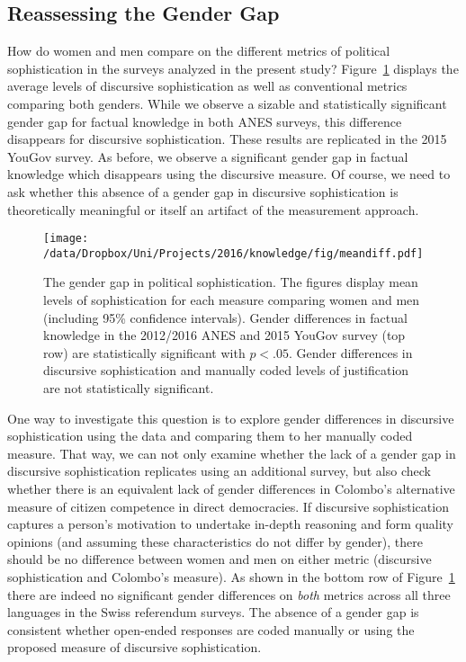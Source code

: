 \subsection*{Reassessing the Gender Gap}
How do women and men compare on the different metrics of political sophistication in the surveys analyzed in the present study? Figure~\ref{fig:meandiff} displays the average levels of discursive sophistication as well as conventional metrics comparing both genders. While we observe a sizable and statistically significant gender gap for factual knowledge in both ANES surveys, this difference disappears for discursive sophistication. These results are replicated in the 2015 YouGov survey. As before, we observe a significant gender gap in factual knowledge which disappears using the discursive measure. Of course, we need to ask whether this absence of a gender gap in discursive sophistication is theoretically meaningful or itself an artifact of the measurement approach. 

\begin{figure}[h]\centering
	\texttt{[image: /data/Dropbox/Uni/Projects/2016/knowledge/fig/meandiff.pdf]}
	\caption[The gender gap in political sophistication]{The gender gap in political sophistication. The figures display mean levels of sophistication for each measure comparing women and men (including 95\% confidence intervals). Gender differences in factual knowledge in the 2012/2016 ANES and 2015 YouGov survey (top row) are statistically significant with $p<.05$. Gender differences in discursive sophistication and manually coded levels of justification \citep{colombo2016justifications} are not statistically significant.}\label{fig:meandiff}
\end{figure}

One way to investigate this question is to explore gender differences in discursive sophistication using the \citet{colombo2016justifications} data and comparing them to her manually coded measure. That way, we can not only examine whether the lack of a gender gap in discursive sophistication replicates using an additional survey, but also check whether there is an equivalent lack of gender differences in Colombo's alternative measure of citizen competence in direct democracies. If discursive sophistication captures a person's motivation to undertake in-depth reasoning and form quality opinions (and assuming these characteristics do not differ by gender), there should be no difference between women and men on either metric (discursive sophistication and Colombo's measure).  As shown in the bottom row of Figure~\ref{fig:meandiff} there are indeed no significant gender differences on \textit{both} metrics across all three languages in the Swiss referendum surveys. The absence of a gender gap is consistent whether open-ended responses are coded manually or using the proposed measure of discursive sophistication.

